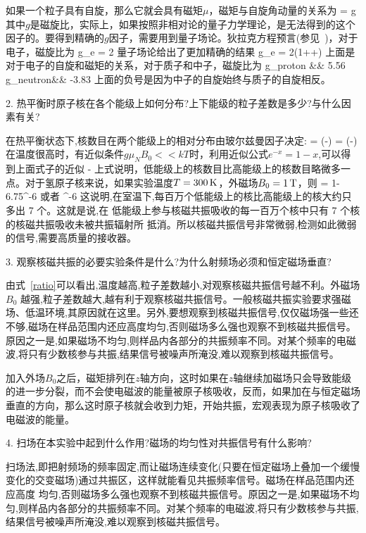 \documentclass{ctexart}
\begin{document}
如果一个粒子具有自旋，那么它就会具有磁矩$\mu$，磁矩与自旋角动量的关系为
\beq
\vec{\mu} = g  
\eeq
其中$g$是磁旋比，实际上，如果按照非相对论的量子力学理论，是无法得到的这个因子的。要得到精确的$g$因子，需要用到量子场论。狄拉克方程预言(参见~\cite{aqm})，对于电子，磁旋比为
\beq
g_e = 2
\eeq
量子场论给出了更加精确的结果
\beq
g_e = 2\left(1+\frac{\alpha}{2\pi}+\cdots\right) 
\eeq
上面是对于电子的自旋和磁矩的关系，对于质子和中子，磁旋比为
\bea
g_{\rm proton} &\simeq& 5.56 \\
g_{\rm neutron}&\simeq& -3.83
\eea
上面的负号是因为中子的自旋始终与质子的自旋相反。

2. 热平衡时原子核在各个能级上如何分布?上下能级的粒子差数是多少?与什么因
素有关?

在热平衡状态下,核数目在两个能级上的相对分布由玻尔兹曼因子决定:
\beq
{} = \exp\left(-\right) = \exp\left(-\right)
\eeq
在温度很高时，有近似条件$g\mu_N B_0 << kT$时，利用近似公式$e^{-x} = 1-x$,可以得到上面式子的近似
\beq
{} -
\eeq
上式说明，低能级上的核数目比高能级上的核数目略微多一点。对于氢原子核来说，如果实验温度$T = 300\,\mathrm{K}$，外磁场$B_0 = 1 \, \mathrm{T}$，则
\beq
{} = 1-6.75^{-6}
\eeq
或者
\beq
{} ^{-6}
\eeq
这说明,在室温下,每百万个低能级上的核比高能级上的核大约只多出 7 个。这就是说,在
低能级上参与核磁共振吸收的每一百万个核中只有 7 个核的核磁共振吸收未被共振辐射所
抵消。所以核磁共振信号非常微弱,检测如此微弱的信号,需要高质量的接收器。

3. 观察核磁共振的必要实验条件是什么?为什么射频场必须和恒定磁场垂直?

由式~\ref{ratio}可以看出,温度越高,粒子差数越小,对观察核磁共振信号越不利。外磁场 $B_0$ 越强,粒子差数越大,越有利于观察核磁共振信号。一般核磁共振实验要求强磁场、低温环境,其原因就在这里。另外,要想观察到核磁共振信号,仅仅磁场强一些还不够,磁场在样品范围内还应高度均匀,否则磁场多么强也观察不到核磁共振信号。原因之一是,如果磁场不均匀,则样品内各部分的共振频率不同。对某个频率的电磁波,将只有少数核参与共振,结果信号被噪声所淹没,难以观察到核磁共振信号。

加入外场$B_0$之后，磁矩排列在$z$轴方向，这时如果在$z$轴继续加磁场只会导致能级的进一步分裂，而不会使电磁波的能量被原子核吸收，反而，如果加在与恒定磁场垂直的方向，那么这时原子核就会收到力矩，开始共振，宏观表现为原子核吸收了电磁波的能量。

4. 扫场在本实验中起到什么作用?磁场的均匀性对共振信号有什么影响?

扫场法,即把射频场的频率固定,而让磁场连续变化(只要在恒定磁场上叠加一个缓慢变化的交变磁场)通过共振区，这样就能看见共振频率信号。磁场在样品范围内还应高度
均匀,否则磁场多么强也观察不到核磁共振信号。原因之一是,如果磁场不均匀,则样品内各部分的共振频率不同。对某个频率的电磁波,将只有少数核参与共振,结果信号被噪声所淹没,难以观察到核磁共振信号。
\end{document}

